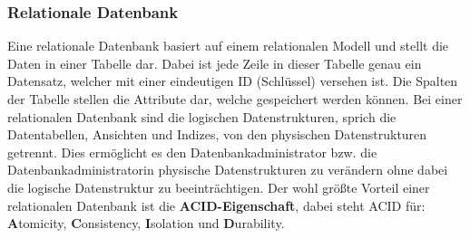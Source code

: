 \subsubsection{Relationale Datenbank}
\newline
Eine relationale Datenbank basiert auf einem relationalen Modell und stellt die Daten in einer Tabelle dar. Dabei ist jede Zeile in dieser Tabelle genau ein Datensatz, welcher mit einer eindeutigen ID (Schlüssel) versehen ist. Die Spalten der Tabelle stellen die Attribute dar, welche gespeichert werden können. Bei einer relationalen Datenbank sind die logischen Datenstrukturen, sprich die Datentabellen, Ansichten und Indizes, von den physischen Datenstrukturen getrennt. Dies ermöglicht es den Datenbankadministrator bzw. die Datenbankadministratorin physische Datenstrukturen zu verändern ohne dabei die logische Datenstruktur zu beeinträchtigen. 
\newline
Der wohl größte Vorteil einer relationalen Datenbank ist die \textbf{ACID-Eigenschaft}, dabei steht ACID für: \textbf{A}tomicity, \textbf{C}onsistency, \textbf{I}solation und \textbf{D}urability.

